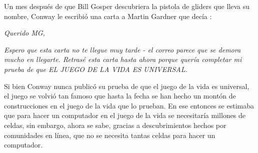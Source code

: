 Un mes despu\'es de que Bill Gosper descubriera la pistola de gliders que lleva su nombre, Conway le escribi\'o una carta a Martin Gardner que dec\'ia \cite{Roberts2015-ur}:
\newpage

\textit{Querido MG,} 

\textit { Espero que esta carta no te llegue muy tarde - el correo parece que se demora mucho en llegarte. Retras\'e esta carta hasta ahora porque quer\'ia completar mi prueba de que EL JUEGO DE LA VIDA ES UNIVERSAL.}

Si bien Conway nunca public\'o su prueba de que el juego de la vida es universal, el juego se volvi\'o tan famoso que hasta la fecha se han hecho un mont\'on de construcciones en el juego de la vida que lo prueban. En ese entonces se estimaba que para hacer un computador en el juego de la vida se necesitar\'ia millones de celdas, sin embargo, ahora se sabe, gracias a descubrimientos hechos por comunidades en l\'inea, que no se necesita tantas celdas para hacer un computador.